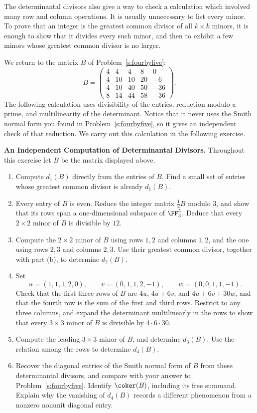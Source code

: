 \documentclass[12pt,reqno]{amsart}
\begin{document}
\hrulefill

The determinantal divisors also give a way to check a calculation which involved many row and column operations. It is usually unnecessary to list every minor. To prove that an integer is the greatest common divisor of all $k\times k$ minors, it is enough to show that it divides every such minor, and then to exhibit a few minors whose greatest common divisor is no larger.

We return to the matrix $B$ of Problem~\ref{s:fourbyfive}:
\[
B=\begin{pmatrix}
4&4&4&8&0\\
4&10&10&20&-6\\
4&10&40&50&-36\\
8&14&44&58&-36
\end{pmatrix}.
\]
The following calculation uses divisibility of the entries, reduction modulo a prime, and multilinearity of the determinant. Notice that it never uses the Smith normal form you found in Problem~\ref{s:fourbyfive}, so it gives an independent check of that reduction. We carry out this calculation in the following exercise.

\hrulefill

\begin{problems}
\item\label{s:integer-minors} \textbf{An Independent Computation of Determinantal Divisors.} Throughout this exercise let $B$ be the matrix displayed above.
\begin{enumerate}
\item Compute $d_1(B)$ directly from the entries of $B$. Find a small set of entries whose greatest common divisor is already $d_1(B)$.
\item Every entry of $B$ is even. Reduce the integer matrix $\tfrac12B$ modulo $3$, and show that its rows span a one-dimensional subspace of $\FF_3^5$. Deduce that every $2\times2$ minor of $B$ is divisible by $12$.
\item Compute the $2\times2$ minor of $B$ using rows $1,2$ and columns $1,2$, and the one using rows $2,3$ and columns $2,3$. Use their greatest common divisor, together with part (b), to determine $d_2(B)$.
\item Set
\[
u=(1,1,1,2,0),\qquad v=(0,1,1,2,-1),\qquad w=(0,0,1,1,-1).
\]
Check that the first three rows of $B$ are $4u$, $4u+6v$, and $4u+6v+30w$, and that the fourth row is the sum of the first and third rows. Restrict to any three columns, and expand the determinant multilinearly in the rows to show that every $3\times3$ minor of $B$ is divisible by $4\cdot6\cdot30$.
\item Compute the leading $3\times3$ minor of $B$, and determine $d_3(B)$. Use the relation among the rows to determine $d_4(B)$.
\item Recover the diagonal entries of the Smith normal form of $B$ from these determinantal divisors, and compare with your answer to Problem~\ref{s:fourbyfive}. Identify $\coker(B)$, including its free summand. Explain why the vanishing of $d_4(B)$ records a different phenomenon from a nonzero nonunit diagonal entry.
\end{enumerate}
\end{problems}
\end{document}
